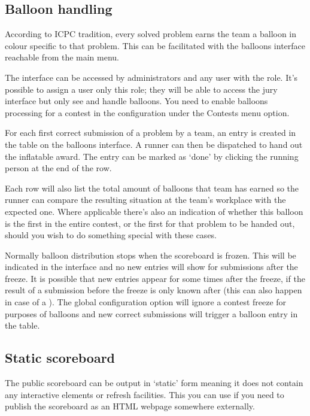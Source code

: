 \documentclass[a4paper,10pt,english,openany]{sphinxmanual}
\begin{document}
\subsection{Balloon handling}
\label{\detokenize{running:balloon-handling}}\label{\detokenize{running:balloons}}
\sphinxAtStartPar
According to ICPC tradition, every solved problem earns the team a
balloon in colour specific to that problem. This can be facilitated
with the balloons interface reachable from the main menu.

\sphinxAtStartPar
The interface can be accessed by administrators and any user with
the  role. It’s possible to assign a user only this
role; they will be able to access the jury interface but only see
and handle balloons. You need to enable balloons processing for a
contest in the configuration under the Contests menu option.

\sphinxAtStartPar
For each first correct submission of a problem by a team, an entry
is created in the table on the balloons interface. A runner can then
be dispatched to hand out the inflatable award. The entry can be
marked as ‘done’ by clicking the running person at the end of the row.

\sphinxAtStartPar
Each row will also list the total amount of balloons that team has
earned so the runner can compare the resulting situation at the
team’s workplace with the expected one. Where applicable there’s
also an indication of whether this balloon is the first in the entire
contest, or the first for that problem to be handed out, should
you wish to do something special with these cases.

\sphinxAtStartPar
Normally balloon distribution stops when the scoreboard is frozen.
This will be indicated in the interface and no new entries will
show for submissions after the freeze. It is possible that new
entries appear for some times after the freeze, if the result of
a submission before the freeze is only known after (this can also
happen in case of a {\hyperref[\detokenize{judging:rejudging}]{}}).
The global configuration option  will
ignore a contest freeze for purposes of balloons and new correct
submissions will trigger a balloon entry in the table.


\subsection{Static scoreboard}
\label{\detokenize{running:static-scoreboard}}
\sphinxAtStartPar
The public scoreboard can be output in ‘static’ form meaning it does
not contain any interactive elements or refresh facilities. This you
can use if you need to publish the scoreboard as an HTML webpage
somewhere externally.
\end{document}
